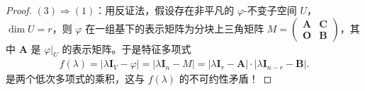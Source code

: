 \documentclass[../../main.tex]{subfiles}%
\begin{document}
\begin{proof}
$(3)\Rightarrow(1)$：用反证法，假设存在非平凡的 $\varphi$-不变子空间 $U$，$\dim U = r$，则 $\varphi$ 在一组基下的表示矩阵为分块上三角矩阵 $M = \begin{pmatrix}
\boldsymbol{A} & \boldsymbol{C} \\
\boldsymbol{O} & \boldsymbol{B}
\end{pmatrix}$，其中 $\boldsymbol{A}$ 是 $\varphi|_U$ 的表示矩阵。于是特征多项式
\begin{align*}
f(\lambda)=|\lambda\boldsymbol{I}_V - \varphi|=|\lambda\boldsymbol{I}_n - M|=|\lambda\boldsymbol{I}_r - \boldsymbol{A}|\cdot|\lambda\boldsymbol{I}_{n - r} - \boldsymbol{B}|.
\end{align*}
是两个低次多项式的乘积，这与 $f(\lambda)$ 的不可约性矛盾！

\end{proof}
\end{document}
